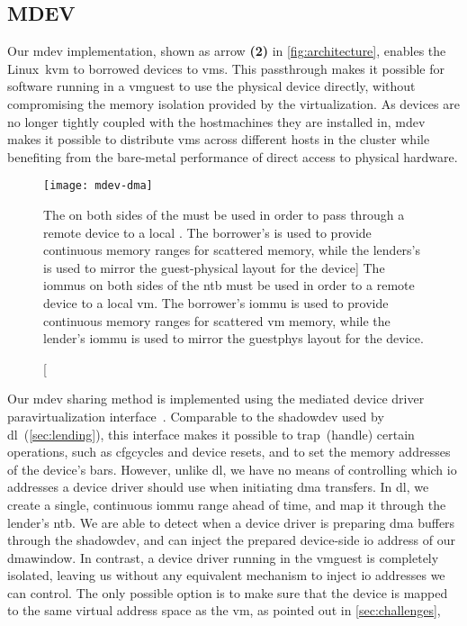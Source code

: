 \subsection{MDEV}\label{sec:mdev}
Our \gls{mdev} implementation, shown as arrow \textbf{(2)} in \cref{fig:architecture}, enables the Linux~\gls{kvm} to \emph{} borrowed devices to \glspl{vm}.
%
This \gls{passthrough} makes it possible for software running in a \gls{vmguest} to use the physical device directly, without compromising the memory isolation provided by the virtualization.
%
As devices are no longer tightly coupled with the \glspl{hostmachine} they are installed in, \gls{mdev} makes it possible to distribute \glspl{vm} across different \glspl{host} in the cluster while benefiting from the bare-metal performance of direct access to physical hardware.

\begin{figure}
    \centering
    \texttt{[image: mdev-dma]}
    \caption
    [The  on both sides of the  must be used in order to pass through a remote device to a local . The borrower's  is used to provide continuous memory ranges for scattered  memory, while the lenders's  is used to mirror the guest-physical layout for the device]
    {The \glspl{iommu} on both sides of the \gls{ntb} must be used in order to  a remote device to a local \gls{vm}. The \gls{borrower}'s \gls{iommu} is used to provide continuous memory ranges for scattered \gls{vm} memory, while the \gls{lender}'s \gls{iommu} is used to mirror the \gls{guestphys} layout for the device.}
    \label{fig:mdev-dma}
\end{figure}


Our \gls{mdev} sharing method is implemented using the mediated device driver \gls{paravirtualization} interface~\cite{url:LinuxMDEV}.
%
Comparable to the \gls{shadowdev} used by \gls{dl}~(\cref{sec:lending}), this interface makes it possible to \gls{trap}~(handle) certain operations, such as \glspl{cfgcycle} and device resets, and to set the memory addresses of the device's \glspl{bar}.
%
However, unlike \gls{dl}, we have no means of controlling which \gls{io} addresses a device driver should use when initiating \gls{dma} transfers.
%
In \gls{dl}, we create a single, continuous \gls{iommu} range ahead of time, and map it through the \gls{lender}'s \gls{ntb}. 
%
We are able to detect when a device driver is preparing \gls{dma} buffers through the \gls{shadowdev}, and can inject the prepared device-side \gls{io} address of our \gls{dmawindow}.
%
In contrast, a device driver running in the \gls{vmguest} is completely isolated, leaving us without any equivalent mechanism to inject \gls{io} addresses we can control.
%
The only possible option is to make sure that the device is mapped to the same virtual address space as the \gls{vm}, as pointed out in \cref{sec:challenges}, 




